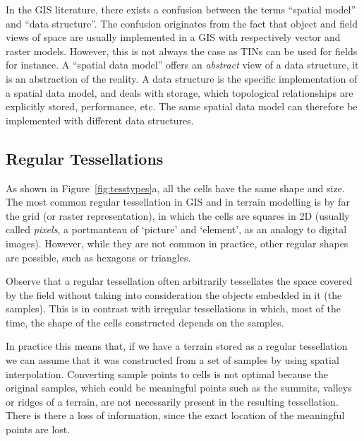 In the GIS literature, there exists a confusion between the terms ``spatial model'' and ``data structure''. 
The confusion originates from the fact that object and field views of space are usually implemented in a GIS with respectively vector and raster models. 
However, this is not always the case as TINs can be used for fields for instance.
A ``spatial data model'' offers an \emph{abstract} view of a data structure, it is an abstraction of the reality.
A data structure is the specific implementation of a spatial data model, and deals with storage, which topological relationships are explicitly stored, performance, etc.
The same spatial data model can therefore be implemented with different data structures.



\subsection{Regular Tessellations} 

As shown in Figure~\ref{fig:tesstypes}a, all the cells have the same shape and size.
The most common regular tessellation in GIS and in terrain modelling is by far the grid (or raster representation), in which the cells are squares in 2D (usually called \emph{pixels}, a portmanteau of `picture' and `element', as an analogy to digital images).
However, while they are not common in practice, other regular shapes are possible, such as hexagons or triangles.

%

Observe that a regular tessellation often arbitrarily tessellates the space covered by the field without taking into consideration the objects embedded in it (the samples). 
This is in contrast with irregular tessellations in which, most of the time, the shape of the cells constructed depends on the samples.

In practice this means that, if we have a terrain stored as a regular tessellation we can assume that it was constructed from a set of samples by using spatial interpolation.
Converting sample points to cells is not optimal because the original samples, which could be meaningful points such as the summits, valleys or ridges of a terrain, are not necessarily present in the resulting tessellation. 
There is there a loss of information, since the exact location of the meaningful points are lost.

